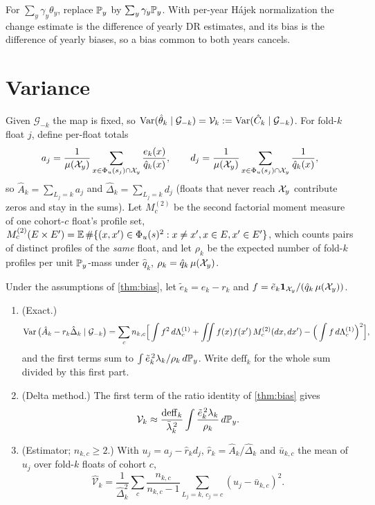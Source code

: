 \begin{remark}\label{rem:changes}
For $\sum_y\gamma_y\theta_y$, replace $\mathbb{P}_y$ by $\sum_y\gamma_y\mathbb{P}_y$. With per-year Hájek
normalization the change estimate is the difference of yearly DR estimates, and its bias is the
difference of yearly biases, so a bias common to both years cancels.
\end{remark}

\section{Variance}\label{sec:variance}

Given $\mathcal G_{-k}$ the map is fixed, so $\operatorname{Var}(\hat\theta_k\mid\mathcal G_{-k})=\mathcal V_k:=\operatorname{Var}(\hat C_k\mid\mathcal G_{-k})$.
For fold-$k$ float $j$, define per-float totals
\[
  a_j=\frac1{\mu(\mathcal{X}_y)}\sum_{x\in\Phi_u(s_j)\cap\mathcal{X}_y}\frac{e_k(x)}{\hat q_k(x)},\qquad
  d_j=\frac1{\mu(\mathcal{X}_y)}\sum_{x\in\Phi_u(s_j)\cap\mathcal{X}_y}\frac1{\hat q_k(x)},
\]
so $\hat A_k=\sum_{L_j=k}a_j$ and $\hat\Delta_k=\sum_{L_j=k}d_j$ (floats that never reach $\mathcal{X}_y$
contribute zeros and stay in the sums). Let $M^{(2)}_c$ be the second factorial moment measure of one
cohort-$c$ float's profile set,
$M^{(2)}_c(E\times E')=\mathbb{E}\,\#\{(x,x')\in\Phi_u(s)^2:x\neq x',x\in E,x'\in E'\}$, which counts pairs of
distinct profiles of the \emph{same} float, and let $\rho_k$ be the expected number
of fold-$k$ profiles per unit $\mathbb{P}_y$-mass under $\hat q_k$, $\rho_k=\hat q_k\,\mu(\mathcal{X}_y)$.

\begin{proposition}\label{prop:var}
Under the assumptions of \cref{thm:bias}, let $\tilde e_k=e_k-r_k$ and $f=\tilde e_k\mathbf 1_{\mathcal{X}_y}/(\hat q_k\,\mu(\mathcal{X}_y))$.
\begin{enumerate}
  \item (Exact.)
  \[
    \operatorname{Var}\big(\hat A_k-r_k\hat\Delta_k\mid\mathcal G_{-k}\big)
    =\sum_cn_{k,c}\Big[\int f^2\,d\Lambda^{(1)}_c+\iint f(x)f(x')\,M^{(2)}_c(dx,dx')-\Big(\int f\,d\Lambda^{(1)}_c\Big)^2\Big],
  \]
  and the first terms sum to $\int\tilde e_k^{\,2}\lambda_k/\rho_k\,d\mathbb{P}_y$. Write
  $\mathrm{deff}_k$ for the whole sum divided by this first part.
  \item (Delta method.) The first term of the ratio identity of \cref{thm:bias} gives
  \[
    \mathcal V_k\approx\frac{\mathrm{deff}_k}{\bar\lambda_k^{\,2}}\int\frac{\tilde e_k^{\,2}\lambda_k}{\rho_k}\,d\mathbb{P}_y .
  \]
  \item (Estimator; $n_{k,c}\ge2$.) With $u_j=a_j-\hat r_kd_j$, $\hat r_k=\hat A_k/\hat\Delta_k$ and $\bar u_{k,c}$ the
  mean of $u_j$ over fold-$k$ floats of cohort $c$,
  \[
    \hat{\mathcal V}_k=\frac1{\hat\Delta_k^2}\sum_c\frac{n_{k,c}}{n_{k,c}-1}\sum_{L_j=k,\,c_j=c}(u_j-\bar u_{k,c})^2 .
  \]
\end{enumerate}
\end{proposition}

